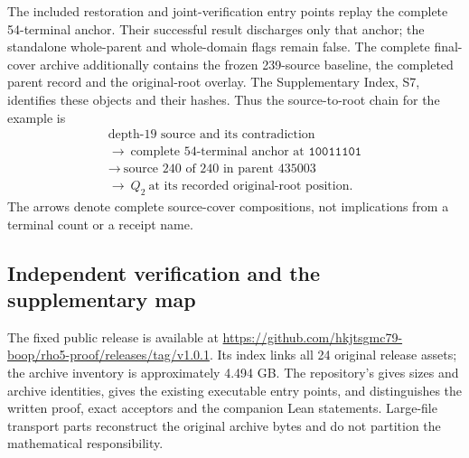\documentclass[11pt,reqno]{amsart}
\theoremstyle{definition}
\theoremstyle{remark}
\begin{document}
The included restoration and joint-verification entry points replay
the complete 54-terminal anchor. Their successful result discharges only
that anchor; the standalone whole-parent and whole-domain flags remain
false. The complete final-cover archive additionally contains the
frozen 239-source baseline, the completed parent record and the
original-root overlay. The Supplementary Index, S7, identifies these objects and
their hashes. Thus the source-to-root chain for the example is
\[
\begin{gathered}
\text{depth-19 source and its contradiction}\\
\longrightarrow\ \text{complete 54-terminal anchor at }
\mathtt{10011101}\\
\longrightarrow\ \text{source 240 of 240 in parent 435003}\\
\longrightarrow\ Q_2\ \text{at its recorded original-root position}.
\end{gathered}
\]
The arrows denote complete source-cover compositions, not implications
from a terminal count or a receipt name.

\subsection{Independent verification and the supplementary map}
\label{certificate:verification}

The fixed public release is available at
\url{https://github.com/hkjtsgmc79-boop/rho5-proof/releases/tag/v1.0.1}.
Its index links all 24 original release assets; the archive inventory is
approximately 4.494 GB. The repository's
 gives sizes and archive identities,
 gives the existing executable entry points, and
 distinguishes the written proof, exact
acceptors and the companion Lean statements. Large-file transport
parts reconstruct the original archive bytes and do not partition the
mathematical responsibility.
\end{document}
